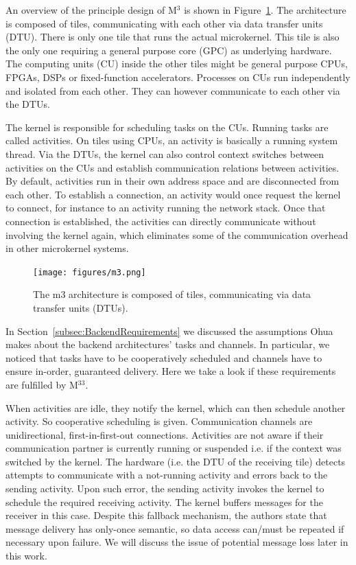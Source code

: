 An overview of the principle design of M$^3$ is shown in Figure~\ref{fig:m3}. The architecture is composed of tiles, communicating with each other via data transfer units (DTU). There is only one tile that runs the actual microkernel. This tile is also the only one requiring a general purpose core (GPC) as underlying hardware. The computing units (CU) inside the other tiles might be general purpose CPUs, FPGAs, DSPs or fixed-function accelerators. Processes on CUs run independently and isolated from each other. They can however communicate to each other via the DTUs.

The kernel is responsible for scheduling tasks on the CUs. Running tasks are called activities. On tiles using CPUs, an activity is basically a running system thread. Via the DTUs, the kernel can also control context switches between activities on the CUs and establish communication relations between activities. By default, activities run in their own address space and are disconnected from each other. To establish a connection, an activity  would once request the kernel to connect, for instance to an activity  running the network stack. Once that connection is established, the activities can directly communicate without involving the kernel again, which eliminates some of the communication overhead in other microkernel systems. 

\begin{figure}[H]
    \centering
    \texttt{[image: figures/m3.png]}
    \caption{The m3 architecture is composed of tiles, communicating via data transfer units (DTUs).}
    \label{fig:m3}
\end{figure}

In Section~\ref{subsec:BackendRequirements} we discussed the assumptions Ohua makes about the backend architectures' tasks and channels. In particular, we noticed that tasks have to be cooperatively scheduled and channels have to ensure in-order, guaranteed delivery. Here we take a look if these requirements are fulfilled by M$^33$.

When activities are idle, they notify the kernel, which can then schedule another activity. So cooperative scheduling is given. Communication channels are unidirectional, first-in-first-out connections. Activities are not aware if their communication partner is currently running or suspended i.e. if the context was switched by the kernel. The hardware (i.e. the DTU of the receiving tile) detects attempts to communicate with a not-running activity and errors back to the sending activity. Upon such error, the sending activity invokes the kernel to schedule the required receiving activity. The kernel buffers messages for the receiver in this case. Despite this fallback mechanism, the authors state that message delivery has only-once semantic, so data access can/must be repeated if necessary upon failure. We will discuss the issue of potential message loss later in this work. 

